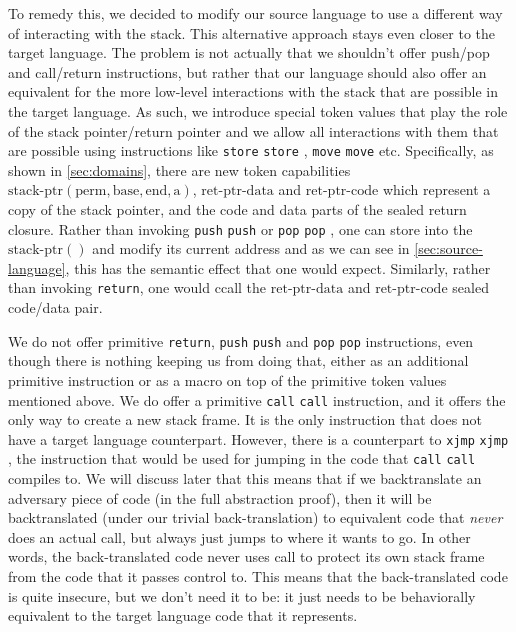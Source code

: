 \documentclass[a4paper]{article}
\newcommand{\sourcecolor}{\color{blue}}
\newcommand{\src}[1]{{\sourcecolor #1}}
\newcommand{\zinstr}[1]{\texttt{#1}}
\newcommand{\oneinstr}[2]{
  \ifthenelse{\equal{#2}{}}
  {\zinstr{#1}}
  {\zinstr{#1} \; #2}
}
\newcommand{\twoinstr}[3]{
  \ifthenelse{\equal{#2#3}{}}
  {\zinstr{#1}}
  {\zinstr{#1} \; #2 \; #3}
}
\newcommand{\sreturn}{\zinstr{\src{return}}}
\newcommand{\spush}[1]{\oneinstr{\src{push}}{#1}}
\newcommand{\spop}[1]{\oneinstr{\src{pop}}{#1}}
\newcommand{\smove}[2]{\twoinstr{\src{move}}{#1}{#2}}
\newcommand{\sstore}[2]{\twoinstr{\src{store}}{#1}{#2}}
\newcommand{\scall}[2]{\twoinstr{\src{call}}{#1}{#2}}
\newcommand{\sxjmp}[2]{\twoinstr{\src{xjmp}}{#1}{#2}}
\newcommand{\shareddom}[1]{\mathrm{#1}}
\newcommand{\permbnf}{\shareddom{perm}}
\newcommand{\addrbnf}{\shareddom{a}}
\newcommand{\basebnf}{\shareddom{base}}
\newcommand{\aendbnf}{\shareddom{end}}
\newcommand{\stkptr}[1]{\mathrm{stack\text{-}ptr}(#1)}
\newcommand{\retptrd}{\mathrm{ret\text{-}ptr\text{-}data}}
\newcommand{\retptrc}{\mathrm{ret\text{-}ptr\text{-}code}}
\begin{document}
To remedy this, we decided to modify our source language to use a different way of interacting with the stack.
This alternative approach stays even closer to the target language.
The problem is not actually that we shouldn't offer push/pop and call/return instructions, but rather that our language should also offer an equivalent for the more low-level interactions with the stack that are possible in the target language.
As such, we introduce special token values that play the role of the stack pointer/return pointer and we allow all interactions with them that are possible using instructions like \sstore{}{}, \smove{}{} etc.
Specifically, as shown in \cref{sec:domains}, there are new token capabilities $\stkptr{\permbnf,\basebnf,\aendbnf,\addrbnf}$, $\retptrd$ and $\retptrc$ which represent a copy of the stack pointer, and the code and data parts of the sealed return closure.
Rather than invoking \spush{} or \spop{}, one can store into the $\stkptr{}$ and modify its current address and as we can see in \cref{sec:source-language}, this has the semantic effect that one would expect.
Similarly, rather than invoking \sreturn{}, one would ccall the $\retptrd$ and $\retptrc$ sealed code/data pair.

We do not offer primitive \sreturn{}, \spush{} and \spop{} instructions, even though there is nothing keeping us from doing that, either as an additional primitive instruction or as a macro on top of the primitive token values mentioned above.
We do offer a primitive \scall{}{} instruction, and it offers the only way to create a new stack frame.
It is the only instruction that does not have a target language counterpart.
However, there is a counterpart to \sxjmp{}{}, the instruction that would be used for jumping in the code that \scall{}{} compiles to.
We will discuss later that this means that if we backtranslate an adversary piece of code (in the full abstraction proof), then it will be backtranslated (under our trivial back-translation) to equivalent code that \emph{never} does an actual call, but always just jumps to where it wants to go.
In other words, the back-translated code never uses call to protect its own stack frame from the code that it passes control to.
This means that the back-translated code is quite insecure, but we don't need it to be: it just needs to be behaviorally equivalent to the target language code that it represents.
\end{document}
